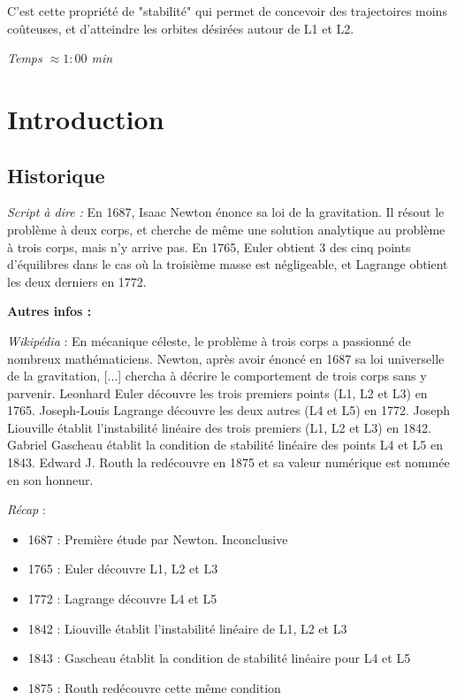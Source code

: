 \documentclass[12pt]{article}
\begin{document}
	C'est cette propriété de "stabilité" qui permet de concevoir des trajectoires moins coûteuses, et d'atteindre les orbites désirées autour de L1 et L2.
	
	\bigskip
	
	\textit{Temps $\approx 1:00$ min}
	
	\clearpage
	
	\section{Introduction}
	\subsection{Historique}
	\textit{Script à dire :}
	En 1687, Isaac Newton énonce sa loi de la gravitation. Il résout le problème à deux corps, et cherche de même une solution analytique au problème à trois corps, mais n'y arrive pas. En 1765, Euler obtient 3 des cinq points d'équilibres dans le cas où la troisième masse est négligeable, et Lagrange obtient les deux derniers en 1772.
	
	\bigskip
	
	\textbf{Autres infos :}
	
	\textit{Wikipédia} :
	En mécanique céleste, le problème à trois corps a passionné de nombreux mathématiciens. Newton, après avoir énoncé en 1687 sa loi universelle de la gravitation, [...] chercha à décrire le comportement de trois corps sans y parvenir. Leonhard Euler découvre les trois premiers points (L1, L2 et L3) en 1765. Joseph-Louis Lagrange découvre les deux autres (L4 et L5) en 1772. Joseph Liouville établit l'instabilité linéaire des trois premiers (L1, L2 et L3) en 1842. Gabriel Gascheau établit la condition de stabilité linéaire des points L4 et L5 en 1843. Edward J. Routh la redécouvre en 1875 et sa valeur numérique est nommée en son honneur.
	
	
	\textit{Récap} :
	\begin{itemize}
		\item 1687 : Première étude par Newton. Inconclusive
		\item 1765 : Euler découvre L1, L2 et L3
		\item 1772 : Lagrange découvre L4 et L5
		\item 1842 : Liouville établit l'instabilité linéaire de L1, L2 et L3
		\item 1843 : Gascheau établit la condition de stabilité linéaire pour L4 et L5
		\item 1875 : Routh redécouvre cette même condition
	\end{itemize}
	
\end{document}
